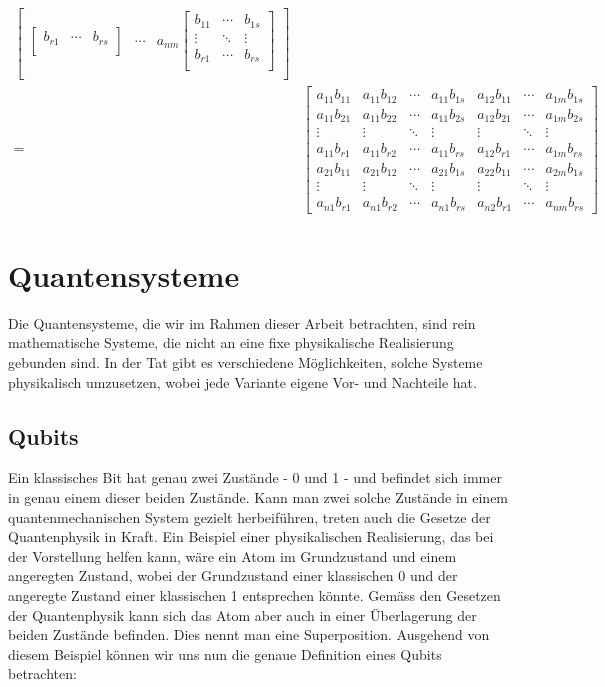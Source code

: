 \begin{align*}
\begin{bmatrix}
\begin{bmatrix}
            b_{r1} & \cdots  & b_{rs} \\
        \end{bmatrix} 
        & \cdots  & a_{nm}\begin{bmatrix}
            b_{11} & \cdots & b_{1s} \\
            \vdots & \ddots  & \vdots \\
            b_{r1} & \cdots  & b_{rs} \\
        \end{bmatrix} \\
    \end{bmatrix} \\[0.5cm]
    =
    &\begin{bmatrix}
        a_{11}b_{11} & a_{11}b_{12} & \cdots & a_{11}b_{1s} & a_{12}b_{11} & \cdots & a_{1m}b_{1s} \\
        a_{11}b_{21} & a_{11}b_{22} & \cdots & a_{11}b_{2s} & a_{12}b_{21} & \cdots & a_{1m}b_{2s} \\
        \vdots & \vdots & \ddots & \vdots & \vdots & \ddots & \vdots \\
        a_{11}b_{r1} & a_{11}b_{r2} & \cdots & a_{11}b_{rs} & a_{12}b_{r1} & \cdots & a_{1m}b_{rs} \\ 
        a_{21}b_{11} & a_{21}b_{12} & \cdots & a_{21}b_{1s} & a_{22}b_{11} & \cdots & a_{2m}b_{1s} \\
        \vdots & \vdots & \ddots & \vdots & \vdots & \ddots & \vdots \\
        a_{n1}b_{r1} & a_{n1}b_{r2} & \cdots & a_{n1}b_{rs} & a_{n2}b_{r1} & \cdots & a_{nm}b_{rs}
    \end{bmatrix}
\end{align*}

\section{Quantensysteme}
Die Quantensysteme, die wir im Rahmen dieser Arbeit betrachten, sind rein mathematische Systeme, die nicht an eine fixe physikalische Realisierung gebunden sind. In der Tat gibt es verschiedene Möglichkeiten, solche Systeme physikalisch umzusetzen, wobei jede Variante eigene Vor- und Nachteile hat.

\subsection{Qubits}
Ein klassisches Bit hat genau zwei Zustände - 0 und 1 - und befindet sich immer in genau einem dieser beiden Zustände. Kann man zwei solche Zustände in einem quantenmechanischen System gezielt herbeiführen, treten auch die Gesetze der Quantenphysik in Kraft. Ein Beispiel einer physikalischen Realisierung, das bei der Vorstellung helfen kann, wäre ein Atom im Grundzustand und einem angeregten Zustand, wobei der Grundzustand einer klassischen 0 und der angeregte Zustand einer klassischen 1 entsprechen könnte. Gemäss den Gesetzen der Quantenphysik kann sich das Atom aber auch in einer Überlagerung der beiden Zustände befinden. Dies nennt man eine Superposition. Ausgehend von diesem Beispiel können wir uns nun die genaue Definition eines Qubits betrachten:
